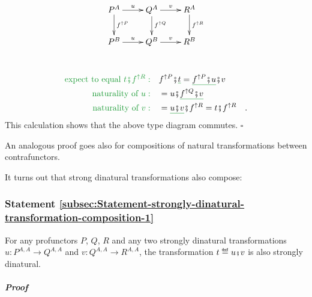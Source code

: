 \begin{wrapfigure}{l}{0.3\columnwidth}%
\vspace{-1.3\baselineskip}
\[
\xymatrix{\xyScaleY{1.8pc}\xyScaleX{2.0pc}P^{A}\ar[d]\sp(0.45){f^{\uparrow P}}\ar[r]\sp(0.5){u} & Q^{A}\ar[d]\sp(0.45){f^{\uparrow Q}}\ar[r]\sp(0.5){v} & R^{A}\ar[d]\sp(0.45){f^{\uparrow R}}\\
P^{B}\ar[r]\sp(0.5){u} & Q^{B}\ar[r]\sp(0.5){v} & R^{B}
}
\]
\vspace{-2.8\baselineskip}
\end{wrapfigure}%

~\vspace{-1\baselineskip}
\begin{align*}
{\color{greenunder}\text{expect to equal }t\bef f^{\uparrow R}:}\quad & f^{\uparrow P}\bef\gunderline t=\gunderline{f^{\uparrow P}\bef u}\bef v\\
{\color{greenunder}\text{naturality of }u:}\quad & =u\bef\gunderline{f^{\uparrow Q}\bef v}\\
{\color{greenunder}\text{naturality of }v:}\quad & =\gunderline{u\bef v}\bef f^{\uparrow R}=t\bef f^{\uparrow R}\quad.
\end{align*}
This calculation shows that the above type diagram commutes. $\square$

An analogous proof goes also for compositions of natural transformations
between contrafunctors.

It turns out that strong dinatural transformations also compose:

\subsubsection{Statement \label{subsec:Statement-strongly-dinatural-transformation-composition-1}\ref{subsec:Statement-strongly-dinatural-transformation-composition-1}}

For any profunctors $P$, $Q$, $R$ and any two strongly dinatural
transformations $u:P^{A,A}\rightarrow Q^{A,A}$ and $v:Q^{A,A}\rightarrow R^{A,A}$,
the transformation $t\triangleq u\bef v$ is also strongly dinatural.

\subparagraph{Proof}

